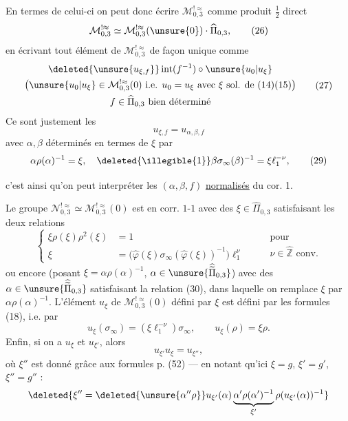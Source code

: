 En termes de celui-ci on peut donc écrire $\mathcal M_{0,3}^{!\approx}$ comme produit $\frac12$ direct
\[
\mathcal M_{0,3}^{!\approx}\simeq\mathcal M_{0,3}^{!\approx}(\unsure{0})\cdot\widehat\Pi_{0,3},
\tag{26}
\]
en écrivant tout élément de $\mathcal M_{0,3}^{!\approx}$ de façon unique comme
\[
\begin{gathered}
\deleted{\unsure{u_{\xi,f}}}\operatorname{int}(f^{-1})\circ\unsure{u_0|u_\xi}\\
\bigl(\unsure{u_0|u_\xi}\in\mathcal M_{0,3}^{!\approx}(0)\text{ i.e. }u_0=u_\xi\text{ avec }\xi\text{ sol. de }(14)(15)\bigr)\\
f\in\widehat\Pi_{0,3}\text{ bien déterminé}
\end{gathered}
\tag{27}
\]
Ce sont justement les  
\[
u_{\xi,f}=u_{\alpha,\beta,f}
\tag{28}
\]
avec $\alpha,\beta$ déterminés en termes de $\xi$ par
\[
\alpha\rho(\alpha)^{-1}=\xi,\quad\deleted{\illegible{1}}\beta\sigma_\infty(\beta)^{-1}=\xi \ell_1^{-\nu},
\tag{29}
\]


c'est ainsi qu'on peut interpréter les  $(\alpha,\beta,f)$ \uline{normalisés} du cor. 1.

\uline{}  Le groupe $\mathcal N_{0,3}^{!\approx}\simeq\mathcal M_{0,3}^{!\approx}(0)$ est en corr. $1$-$1$ avec  des $\xi\in\widehat\Pi_{0,3}$ satisfaisant les deux relations
\[
\left\{
\begin{aligned}
\xi\rho(\xi)\rho^2(\xi)&=1\\
\xi&=\bigl(\widehat\varphi(\xi)\sigma_\infty(\widehat\varphi(\xi))^{-1}\bigr)\ell_1^\nu
\end{aligned}
\right.
\qquad\begin{gathered}\text{pour}\\\nu\in\widehat{\mathbb Z}\text{ conv.}\end{gathered}
\tag{30}
\]
ou encore (posant $\xi=\alpha\rho(\alpha)^{-1}$, $\alpha\in\unsure{\widehat{\widetilde\Pi}_{0,3}}$) avec  des $\alpha\in\unsure{\widehat{\widetilde\Pi}_{0,3}}$ satisfaisant la  relation (30), dans laquelle on remplace $\xi$ par $\alpha\rho(\alpha)^{-1}$. L'élément $u_\xi$ de $\mathcal M_{0,3}^{!\approx}(0)$ défini par $\xi$ est défini par les formules (18), i.e. par
\[
u_\xi(\sigma_\infty)=(\xi \ell_1^{-\nu})\sigma_\infty,
\qquad u_\xi(\rho)=\xi\rho.
\tag{31}
\]
Enfin, si on a $u_\xi$ et $u_{\xi'}$, alors
\[
u_{\xi'}u_\xi=u_{\xi''},
\tag{32}
\]
où $\xi''$ est donné grâce aux formules p.  (52) --- en notant qu'ici $\xi=g$, $\xi'=g'$, $\xi''=g''$ :
\[
\deleted{\xi''=\deleted{\unsure{\alpha''\rho}}u_{\xi'}(\alpha)\underbrace{\alpha'\rho(\alpha')^{-1}}_{\xi'}\rho(u_{\xi'}(\alpha))^{-1}}
\]

